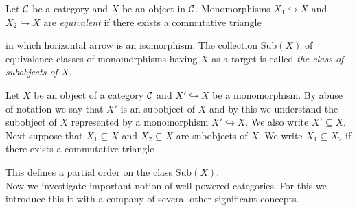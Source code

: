 \begin{definition}
Let ${\mathcal C}$ be a category and $X$ be an object in ${\mathcal C}$. Monomorphisms $X_1\hookrightarrow X$ and $X_2\hookrightarrow X$ are \textit{equivalent} if there exists a commutative triangle
\begin{center}
\end{center}
in which horizontal arrow is an isomorphism. The collection $\mathrm{Sub}(X)$ of equivalence classes of monomorphisms having $X$ as a target is called \textit{the class of subobjects of $X$}.
\end{definition}
\noindent
Let $X$ be an object of a category ${\mathcal C}$ and $X'\hookrightarrow X$ be a monomorphism. By abuse of notation we say that $X'$ is an subobject of $X$ and by this we understand the subobject of $X$ represented by a monomorphism $X'\hookrightarrow X$. We also write $X'\subseteq X$. Next suppose that $X_1\subseteq X$ and $X_2\subseteq X$ are subobjects of $X$. We write $X_1\subseteq X_2$ if there exists a commutative triangle
\begin{center}
\end{center}
This defines a partial order on the class $\mathrm{Sub}(X)$.\\
Now we investigate important notion of well-powered categories. For this we introduce this it with a company of several other significant concepts. 

